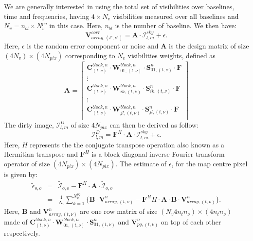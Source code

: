 \documentclass[useAMS,usenatbib]{mn2e}
\begin{document}
We are generally interested in using the total set of visibilities over baselines, time and frequencies, having $4\times N_v$ visibilities 
measured over all baselines  and $N_v=n_{bl}\times N_v^{pq}$ in this case. Here, $n_{bl}$ is the number of baseline. We then have:
\begin{equation}
 \mathbf{V}_{array,(t',\nu')}^{corr}=\mathbf{A}\cdot\mathcal{I}_{l,m}^{sky} + \epsilon. \label{eq:vall}
\end{equation}
Here, $\epsilon$ is the random error component or noise and $\mathbf{A}$ is the design matrix of size 
$(4N_v)\times (4N_{pix})$ 
corresponding to $N_v$ visibilities weights, defined as
\begin{equation*}
\mathbf{A}_{}=
  \begin{bmatrix}
    \mathbf{C}_{(t,\nu)}^{block,n}\cdot \mathbf{W}_{01,(t,\nu)}^{block,n}\cdot \mathbf{S}_{01,(t,\nu)}^{n} \cdot\mathbf{F}\\
    \vdots\\
    \mathbf{C}_{(t,\nu)}^{block,n}\cdot \mathbf{W}_{ik,(t,\nu)}^{block,n}\cdot \mathbf{S}_{ik,(t,\nu)}^{n} \cdot\mathbf{F}\\
    \vdots \\
    \mathbf{C}_{(t,\nu)}^{block,n}\cdot \mathbf{W}_{jl,(t,\nu)}^{block,n}\cdot \mathbf{S}_{jl,(t,\nu)}^{n} \cdot\mathbf{F}\\
  \end{bmatrix}
\end{equation*}
The dirty image, $\mathcal{I}_{l,m}^{D}$ of size $4N_{pix}$ can then be derived as follow:
\begin{equation}
\mathcal{I}_{l,m}^{D}=\mathbf{F}^{H}\cdot\mathbf{A}\cdot\mathcal{I}_{l,m}^{sky} + \epsilon.
\end{equation}
Here, $H$ represents the the conjugate transpose operation also known as a Hermitian transpose and $\mathbf{F}^{H}$ is a block diagonal
inverse Fourier transform operator of size $(4N_{pix})\times(4N_{pix})$. The estimate of  $\epsilon$, for the map centre pixel is given by:
\begin{eqnarray*}
 \widetilde{\epsilon}_{o,o}&=&\widetilde{\mathcal{I}}_{o,o} - \mathbf{F}^{H}\cdot\mathbf{A}\cdot\widetilde{\mathcal{I}}_{o,o}\\		
	&=&\frac{1}{N_{v}}\sum_{k=1}^{N_{v}^{pq}}\Bigg\{\mathbf{B}\cdot\mathbf{V}_{array,(t,\nu)}^{n}-
\mathbf{F}^{H}{H}\cdot\mathbf{A}\cdot\mathbf{B}\cdot\mathbf{V}_{array,(t,\nu)}^{n}\Bigg\}.
\end{eqnarray*}
Here, $\mathbf{B}$ and $\mathbf{V}_{array,(t,\nu)}^{n}$ are  one row matrix of size $(N_v 4 n_t n_{\nu})\times (4 n_t n_{\nu})$ made of 
$\mathbf{C}_{(t,\nu)}^{block,n}\cdot \mathbf{W}_{01,(t,\nu)}^{block,n}\cdot \mathbf{S}_{01,(t,\nu)}^{n}$ and $\mathbf{V}_{pq,(t,\nu)}^{n}$
on top of each other respectively.
\end{document}
